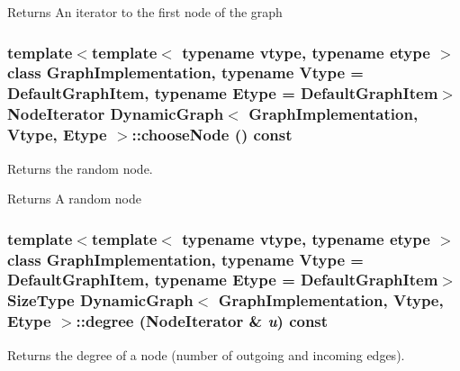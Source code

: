 \begin{DoxyReturn}{Returns}
An iterator to the first node of the graph 
\end{DoxyReturn}
\hypertarget{class_dynamic_graph_a38e3b1c0ba0d147fabffc3b8cbe0585b}{
\subsubsection[{chooseNode}]{\setlength{\rightskip}{0pt plus 5cm}template$<$template$<$ typename vtype, typename etype $>$ class GraphImplementation, typename Vtype  = DefaultGraphItem, typename Etype  = DefaultGraphItem$>$ NodeIterator {\bf DynamicGraph}$<$ GraphImplementation, Vtype, Etype $>$::chooseNode () const}}
\label{class_dynamic_graph_a38e3b1c0ba0d147fabffc3b8cbe0585b}


Returns the random node. 

\begin{DoxyReturn}{Returns}
A random node 
\end{DoxyReturn}
\hypertarget{class_dynamic_graph_a1cd46c594141888b39788aa2096c5e3c}{
\subsubsection[{degree}]{\setlength{\rightskip}{0pt plus 5cm}template$<$template$<$ typename vtype, typename etype $>$ class GraphImplementation, typename Vtype  = DefaultGraphItem, typename Etype  = DefaultGraphItem$>$ SizeType {\bf DynamicGraph}$<$ GraphImplementation, Vtype, Etype $>$::degree (NodeIterator \& {\em u}) const}}
\label{class_dynamic_graph_a1cd46c594141888b39788aa2096c5e3c}


Returns the degree of a node (number of outgoing and incoming edges). 


